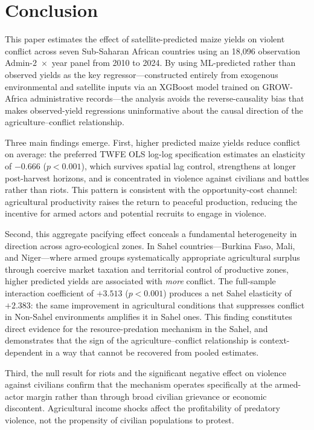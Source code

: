 \section{Conclusion}
\label{sec:conclusion}

This paper estimates the effect of satellite-predicted maize yields on violent conflict across seven Sub-Saharan African countries using an 18,096 observation Admin-2~$\times$~year panel from 2010 to 2024. By using ML-predicted rather than observed yields as the key regressor---constructed entirely from exogenous environmental and satellite inputs via an XGBoost model trained on GROW-Africa administrative records---the analysis avoids the reverse-causality bias that makes observed-yield regressions uninformative about the causal direction of the agriculture--conflict relationship.

Three main findings emerge. First, higher predicted maize yields reduce conflict on average: the preferred TWFE OLS log-log specification estimates an elasticity of $-0.666$ ($p < 0.001$), which survives spatial lag control, strengthens at longer post-harvest horizons, and is concentrated in violence against civilians and battles rather than riots. This pattern is consistent with the opportunity-cost channel: agricultural productivity raises the return to peaceful production, reducing the incentive for armed actors and potential recruits to engage in violence.

Second, this aggregate pacifying effect conceals a fundamental heterogeneity in direction across agro-ecological zones. In Sahel countries---Burkina Faso, Mali, and Niger---where armed groups systematically appropriate agricultural surplus through coercive market taxation and territorial control of productive zones, higher predicted yields are associated with \textit{more} conflict. The full-sample interaction coefficient of $+3.513$ ($p < 0.001$) produces a net Sahel elasticity of $+2.383$: the same improvement in agricultural conditions that suppresses conflict in Non-Sahel environments amplifies it in Sahel ones. This finding constitutes direct evidence for the resource-predation mechanism in the Sahel, and demonstrates that the sign of the agriculture--conflict relationship is context-dependent in a way that cannot be recovered from pooled estimates.

Third, the null result for riots and the significant negative effect on violence against civilians confirm that the mechanism operates specifically at the armed-actor margin rather than through broad civilian grievance or economic discontent. Agricultural income shocks affect the profitability of predatory violence, not the propensity of civilian populations to protest.


